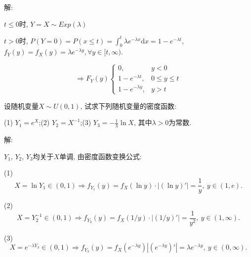\documentclass[standard]{ExBook}
\begin{document}
\begin{qitems}
\vspace{-5em}

    \begin{bbox}
解: 

$t\leq0$时, $Y=X\sim Exp(\lambda)$

$t>0$时, $P(Y=0)=P(x\leq t)=\displaystyle\int_{0}^{t}\lambda e^{-\lambda x}\mathrm{d}x=1-e^{-\lambda t}$, $f_{Y}(y)=f_{X}(y)=\lambda e^{-\lambda y},\forall y\in[t,\infty)$.
\vspace{-2em}
\begin{center}
\begin{equation}
    \Longrightarrow
    F_{Y}(y)
    \left\{
    \begin{array}{cl}
        \nonumber
        0, &y<0\\
        1-e^{-\lambda t}, &0\leq y\leq t\\
        1-e^{-\lambda y}, &y >t
    \end{array}
    \right.
\end{equation}
\end{center}
    \end{bbox}

\vspace{-5em}

    \begin{bbox}
    \begin{shaded}
        \qitem
设随机变量$X\sim U(0,1)$, 试求下列随机变量的密度函数:

(1) $Y_{1}=e^X$;\qquad(2) $Y_{2}=X^{-1}$;\qquad(3) $Y_{3}=-\frac{1}{\lambda}\ln X$, 其中$\lambda > 0$为常数.
    \end{shaded}
    \end{bbox}

\vspace{-5em}

    \begin{bbox}
解: 

$Y_1$, $Y_2$, $Y_3$均关于$X$单调, 由密度函数变换公式:

(1) $$X=\ln Y_1\in(0,1) \Longrightarrow f_{Y_1}(y)=f_{X}(\ln y)\cdot|(\ln y)'|=\displaystyle\frac{1}{y},\ y\in(1,e).$$

(2) $$X=Y_{2}^{-1}\in(0,1) \Longrightarrow f_{Y_2}(y)=f_{X}(1/y)\cdot|(1/y)'|=\displaystyle\frac{1}{y^2},\ y\in(1,\infty).$$
    \end{bbox}

\vspace{-5em}

    \begin{bbox}
(3) $$X=e^{-\lambda Y_3}\in(0,1) \Longrightarrow f_{Y_3}(y)=f_{X}(e^{-\lambda y})|(e^{-\lambda y})'|=\lambda e^{-\lambda y},\ y\in(0,\infty).$$


\end{bbox}
\end{qitems}
\end{document}
